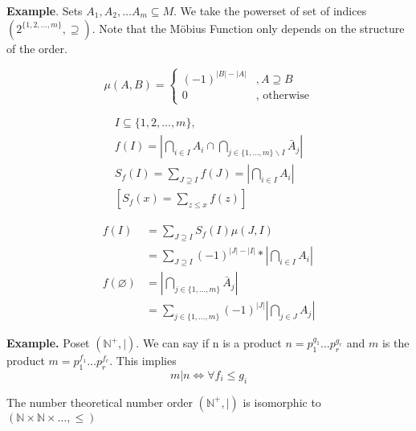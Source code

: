 

\textbf{Example}.
Sets $A_1, A_2, \ldots A_m \subseteq M$. We take the powerset of set of indices $(2^{\{1,2, \ldots , m\}}, \supseteq)$. 
Note that the Möbius Function only depends on the structure of the order. 

\[
  \mu (A,B) = \begin{cases} 
    (-1)^{|B| - |A|} &, A\supseteq B\\ 
    0                & \text{, otherwise}
  \end{cases}
\]

\begin{gather*}
  I \subseteq \{ 1,2, \ldots, m\}, \\
  f(I) = \left| \bigcap_{i\in I} A_i \cap 
    \bigcap_{j \in \{1,\ldots ,m\} \backslash I} \bar{A}_j \right| \\
  S_f(I) = \sum_{J \supseteq I} f(J) = \left| \bigcap_{i\in I} A_i  \right| \\
  \left[ S_f(x) = \sum_{z\leq x} f(z) \right]
\end{gather*}

\begin{align*}
  f(I) &= \sum_{J \supseteq I} S_f(I) \mu(J,I) \\
    &= \sum_{J \supseteq I} (-1)^{|J| - |I|} * \left| \bigcap_{i\in I} A_i \right| \\
  f(\varnothing) &= \left| \bigcap_{j \in \{1,\ldots ,m\}} \bar{A}_j \right| \\
    &= \sum_{j \in \{1,\ldots ,m\}} (-1)^{|J|} \left| \bigcap_{j \in J} A_j \right|
\end{align*}

\textbf{Example.}
Poset $(\mathbb{N}^{+}, \mid)$.
We can say if n is a product $n = p_1^{g_1} \ldots p_r^{g_r}$ and $m$ is the product $m = p_1^{f_1} \ldots p_r^{f_r}$. This implies 
\[
  m|n \iff \forall f_i \leq g_i
\]

The number theoretical number order $(\mathbb{N}^{+}, \mid)$ is isomorphic to $(\mathbb{N} \times \mathbb{N} \times \ldots , \leq)$

